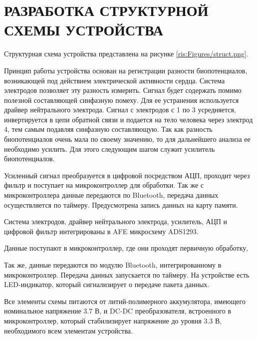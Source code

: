 \begin{sloppypar} %
\newpage %
\section{РАЗРАБОТКА СТРУКТУРНОЙ СХЕМЫ УСТРОЙСТВА} %
Структурная схема устройства представлена на рисунке \ref{ris:Figures/struct.png}.

Принцип работы устройства основан на регистрации разности биопотенциалов, возникающей под действием электрической активности сердца. Система электродов позволяет эту разность измерить. Сигнал будет содержать помимо полезной составляющей синфазную помеху. Для ее устранения используется драйвер нейтрального электрода. Сигнал с электродов с 1 по 3 усредняется, инвертируется в цепи обратной связи и подается на тело человека через электрод 4, тем самым подавляя синфазную составляющую. Так как разность биопотенциалов очень мала по своему значению, то для дальнейшего анализа ее необходимо усилить. Для этого следующим шагом служит усилитель биопотенциалов. 


Усиленный сигнал преобразуется в цифровой посредством АЦП, проходит через фильтр и поступает на микроконтроллер для обработки. Так же с микроконтроллера данные передаются по Bluetooth, передача данных осуществляется по таймеру. Предусмотрена запись данных на карту памяти. 

Система электродов, драйвер нейтрального электрода, усилитель, АЦП и цифровой фильтр интегрированы в AFE микросхему ADS1293.


Данные поступают в микроконтроллер, где они проходят первичную обработку, 

Так же, данные передаются по модулю Bluetooth, интегрированному в микроконтроллер. Передача данных запускается по таймеру. На устройстве есть LED-индикатор, который сигнализирует о передаче пакета данных. 

Все элементы схемы питаются от литий-полимерного аккумулятора, имеющего номинальное напряжение 3.7 В, и DC-DC преобразователя, встроенного в микроконтроллер, который стабилизирует напряжение до уровня 3.3 В, необходимого всем элементам устройства.

\end{sloppypar}
